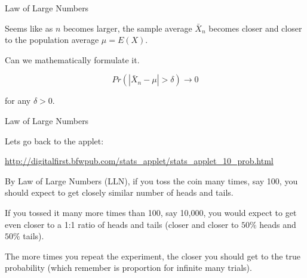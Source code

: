 \documentclass{beamer}\usepackage[]{graphicx}\usepackage[]{color}
\begin{document}
\begin{frame}[fragile]{Law of Large Numbers \;\;}

Seems like as $n$ becomes larger, the sample average $\bar{X}_{n}$ becomes closer and closer to the population average $\mu= E(X)$. \pause \newline

Can we mathematically formulate it.

$$ Pr ( \left | \bar{X}_{n} - \mu \right | > \delta) \rightarrow 0 $$

for any $\delta > 0 $.

\end{frame}

\begin{frame}[fragile]{Law of Large Numbers \;\;}

Lets go back to the applet:

\url{http://digitalfirst.bfwpub.com/stats_applet/stats_applet_10_prob.html}
\pause \newline

By Law of Large Numbers (LLN), if you toss the coin many times, say 100, you should expect to get closely similar number of heads and tails.  \pause \newline

If you tossed it many more times than 100, say 10,000, you would expect to
get even closer to a 1:1 ratio of heads and tails (closer and closer
to $50\%$ heads and $50 \%$ tails). \pause \newline

The more times you repeat the experiment, the closer you should get to the true probability (which remember is proportion for infinite many trials).

\end{frame}
\end{document}
